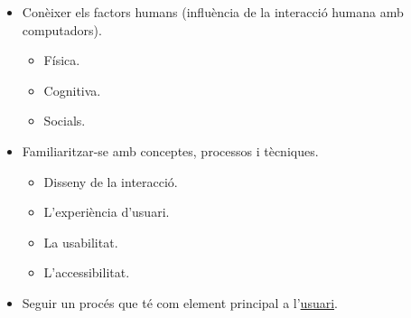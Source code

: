 \begin{itemize}
    \item Conèixer els factors humans (influència de la interacció humana amb computadors).
        \begin{itemize}
            \item Física.
            \item Cognitiva.
            \item Socials.
        \end{itemize}
    \item Familiaritzar-se amb conceptes, processos i tècniques.
        \begin{itemize}
            \item Disseny de la interacció.
            \item L'experiència d'usuari.
            \item La usabilitat.
            \item L'accessibilitat.
        \end{itemize}
    \item Seguir un procés que té com element principal a l'\underline{usuari}.
\end{itemize}